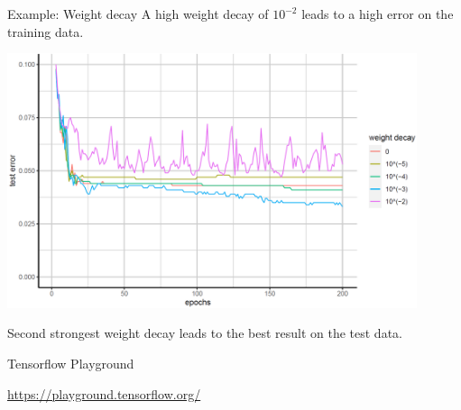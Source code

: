 \begin{vbframe}{Example: Weight decay}
A high weight decay of $10^{-2}$ leads to a high error on the training data.
\framebreak

\begin{center}
\includegraphics[width=0.9\textwidth]{plots/weight-decay02.png}
\end{center}

Second strongest weight decay leads to the best result on the test data.
\end{vbframe}
  

\begin{frame}{Tensorflow Playground}
  \begin{figure}
    \centering
  \end{figure}
  \scriptsize
  \url{https://playground.tensorflow.org/}
\end{frame}

